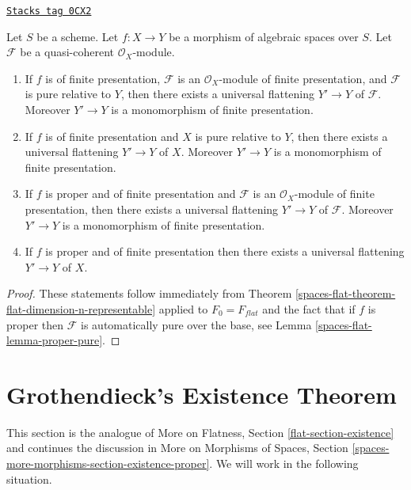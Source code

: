 \begin{lemma}
\label{spaces-flat-lemma-when-universal-flattening}
\href{https://stacks.math.columbia.edu/tag/0CX2}{\texttt{Stacks tag 0CX2}}

Let $S$ be a scheme.
Let $f : X \to Y$ be a morphism of algebraic spaces over $S$.
Let $\mathcal{F}$ be a quasi-coherent $\mathcal{O}_X$-module.
\begin{enumerate}
\item If $f$ is of finite presentation, $\mathcal{F}$ is an
$\mathcal{O}_X$-module of finite presentation, and $\mathcal{F}$ is
pure relative to $Y$, then there exists a universal flattening
$Y' \to Y$ of $\mathcal{F}$. Moreover $Y' \to Y$ is a monomorphism
of finite presentation.
\item If $f$ is of finite presentation and $X$ is pure relative to $Y$,
then there exists a universal flattening $Y' \to Y$ of $X$.
Moreover $Y' \to Y$ is a monomorphism of finite presentation.
\item If $f$ is proper and of finite presentation and $\mathcal{F}$ is an
$\mathcal{O}_X$-module of finite presentation, then there exists a
universal flattening $Y' \to Y$ of $\mathcal{F}$. Moreover $Y' \to Y$ is
a monomorphism of finite presentation.
\item If $f$ is proper and of finite presentation
then there exists a universal flattening $Y' \to Y$ of $X$.
\end{enumerate}
\end{lemma}

\begin{proof}
These statements follow immediately from
Theorem \ref{spaces-flat-theorem-flat-dimension-n-representable}
applied to $F_0 = F_{flat}$
and the fact that if $f$ is proper then $\mathcal{F}$ is automatically
pure over the base, see
Lemma \ref{spaces-flat-lemma-proper-pure}.
\end{proof}

\section{Grothendieck's Existence Theorem}
\label{spaces-flat-section-existence}
This section is the analogue of
More on Flatness, Section \ref{flat-section-existence}
and continues the discussion in
More on Morphisms of Spaces, Section
\ref{spaces-more-morphisms-section-existence-proper}.
We will work in the following situation.

